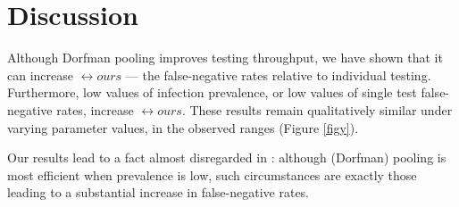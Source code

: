 \documentclass{article}
\begin{document}
\section{Discussion}
Although Dorfman pooling improves testing throughput, we have shown
that it can increase $\rel{ours}$ --- the false-negative rates relative to
individual testing. Furthermore, low values of infection prevalence,
or low values of single test false-negative rates, increase
$\rel{ours}$. These results remain qualitatively similar under varying
parameter values, in the observed ranges
\cite{KitComparison,EstimatingRatesKucrika, EstimatingRatesLourenco,
  InterpretingCOVID19Test} (Figure \ref{figy}).

Our results lead to a fact almost disregarded in
\cite{DorfmanYuvalDor}: although (Dorfman) pooling is most efficient
when prevalence is low, such circumstances are exactly those leading
to a substantial increase in false-negative rates.


\end{document}
